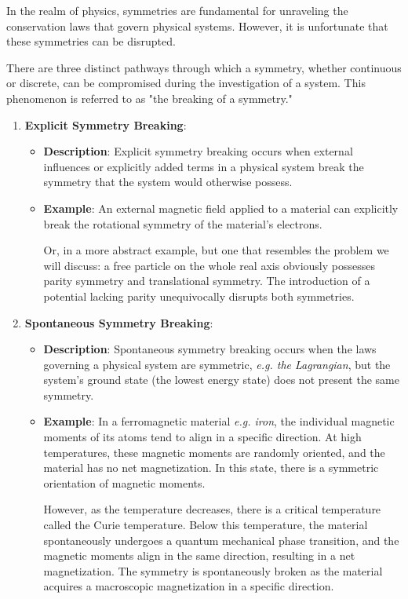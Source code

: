 In the realm of physics, symmetries are fundamental for unraveling the conservation laws that govern physical systems. However, it is unfortunate that these symmetries can be disrupted.

There are three distinct pathways through which a symmetry, whether continuous or discrete, can be compromised during the investigation of a system. This phenomenon is referred to as "the breaking of a symmetry."

\begin{enumerate}
    \item \textbf{Explicit Symmetry Breaking}:
          \begin{itemize}
              \item \textbf{Description}: Explicit symmetry breaking occurs when external influences or explicitly added terms in a physical system break the symmetry that the system would otherwise possess.
              \item \textbf{Example}: An external magnetic field applied to a material can explicitly break the rotational symmetry of the material's electrons.

                    Or, in a more abstract example, but one that resembles the problem we will discuss: a free particle on the whole real axis obviously possesses parity symmetry and translational symmetry. The introduction of a potential lacking parity unequivocally disrupts both symmetries.
          \end{itemize}

    \item \textbf{Spontaneous Symmetry Breaking}:
          \begin{itemize}
              \item \textbf{Description}: Spontaneous symmetry breaking occurs when the laws governing a physical system are symmetric, \textit{e.g. the Lagrangian}, but the system's ground state (the lowest energy state) does not present the same symmetry.

              \item \textbf{Example}: In a ferromagnetic material \textit{e.g. iron}, the individual magnetic moments of its atoms tend to align in a specific direction. At high temperatures, these magnetic moments are randomly oriented, and the material has no net magnetization. In this state, there is a symmetric orientation of magnetic moments.

                    However, as the temperature decreases, there is a critical temperature called the Curie temperature. Below this temperature, the material spontaneously undergoes a quantum mechanical phase transition, and the magnetic moments align in the same direction, resulting in a net magnetization. The symmetry is spontaneously broken as the material acquires a macroscopic magnetization in a specific direction.


\end{itemize}
\end{enumerate}
